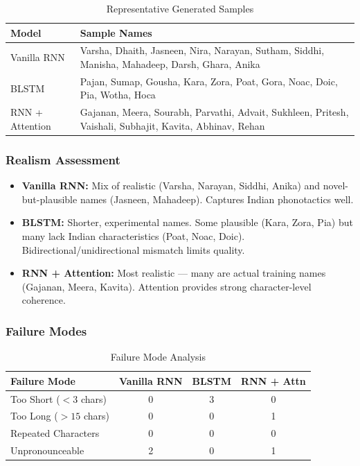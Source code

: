 \documentclass[11pt,a4paper]{article}
\begin{document}
\begin{table}[H]
\centering
\caption{Representative Generated Samples}
\vspace{-0.5em}
\small
\begin{tabular}{lp{10cm}}
\toprule
\textbf{Model} & \textbf{Sample Names} \\
\midrule
Vanilla RNN & Varsha, Dhaith, Jasneen, Nira, Narayan, Sutham, Siddhi, Manisha, Mahadeep, Darsh, Ghara, Anika \\
\midrule
BLSTM & Pajan, Sumap, Gousha, Kara, Zora, Poat, Gora, Noac, Doic, Pia, Wotha, Hoca \\
\midrule
RNN + Attention & Gajanan, Meera, Sourabh, Parvathi, Advait, Sukhleen, Pritesh, Vaishali, Subhajit, Kavita, Abhinav, Rehan \\
\bottomrule
\end{tabular}
\end{table}

\subsubsection{Realism Assessment}
\begin{itemize}
    \item \textbf{Vanilla RNN:} Mix of realistic (Varsha, Narayan, Siddhi, Anika) and novel-but-plausible names (Jasneen, Mahadeep). Captures Indian phonotactics well.
    \item \textbf{BLSTM:} Shorter, experimental names. Some plausible (Kara, Zora, Pia) but many lack Indian characteristics (Poat, Noac, Doic). Bidirectional/unidirectional mismatch limits quality.
    \item \textbf{RNN + Attention:} Most realistic --- many are actual training names (Gajanan, Meera, Kavita). Attention provides strong character-level coherence.
\end{itemize}

\subsubsection{Failure Modes}

\begin{table}[H]
\centering
\caption{Failure Mode Analysis}
\vspace{-0.5em}
\begin{tabular}{lccc}
\toprule
\textbf{Failure Mode} & \textbf{Vanilla RNN} & \textbf{BLSTM} & \textbf{RNN + Attn} \\
\midrule
Too Short ($<3$ chars) & 0 & 3 & 0 \\
Too Long ($>15$ chars) & 0 & 0 & 1 \\
Repeated Characters & 0 & 0 & 0 \\
Unpronounceable & 2 & 0 & 1 \\
\bottomrule
\end{tabular}
\end{table}
\end{document}
